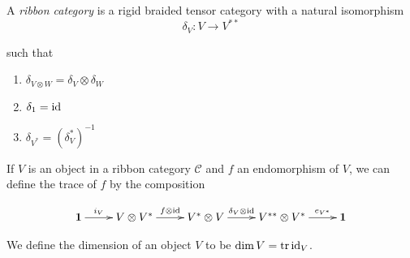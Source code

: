 \begin{defn}

    A \emph{ribbon category} is a rigid braided tensor category with a natural
    isomorphism
    \begin{equation}
        \delta_V: V \to V^{**}
    \end{equation}

such that 
\begin{enumerate}
    \renewcommand{\labelenumi}{\roman{enumi})}

    \item $\delta_{V \otimes W} = \delta_V \otimes \delta_W$
    \item $\delta_1 = \operatorname{id}$
    \item $\delta_{V^*} = (\delta_V^*)^{-1}$
\end{enumerate}

\end{defn}

If $V$ is an object in a ribbon category $\mathcal{C}$ and $f$ an endomorphism
of $V$, we can define the trace of $f$ by the composition

\begin{equation}
    \xymatrix{
    \one \ar[r]^-{i_V} & V \otimes V^* \ar[r]^-{f \otimes \id} & V^* \otimes V \ar[r]^-{\delta_V \otimes \id} & V^{**} \otimes V^* \ar[r]^-{e_{V^*}} & 
    \one
    }
\end{equation}

We define the dimension of an object $V$ to be $\dim V = \operatorname{tr} \operatorname{id}_V$.

